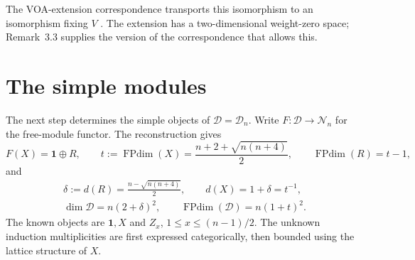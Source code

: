 \documentclass[11pt]{article}
\newcommand{\one}{\mathbf1}\newcommand{\D}{\mathcal D}\newcommand{\Dcat}{\mathcal D}
\newcommand{\Ncat}{\mathcal N}\newcommand{\Pcat}{\mathcal P}\newcommand{\Fcat}{\mathcal F}
\newcommand{\FP}{\operatorname{FPdim}}\newcommand{\Irr}{\operatorname{Irr}}
\numberwithin{equation}{section}
\begin{document}
The VOA-extension correspondence transports this isomorphism to an isomorphism fixing $V$ \cite[Theorem 3.2 and Remark 3.3]{B:HKL}. The extension has a two-dimensional weight-zero space; Remark~3.3 supplies the version of the correspondence that allows this.

\section{The simple modules}\label{sec:spectrum}
The next step determines the simple objects of $\D=\D_n$. Write $F:\D\to\Ncat_n$ for the free-module functor. The reconstruction gives
\begin{equation}\label{B:FX}
 F(X)=\one\oplus R,\qquad
 t:=\FP(X)=\frac{n+2+\sqrt{n(n+4)}}2,\qquad \FP(R)=t-1,
\end{equation}
and
\begin{equation}\label{B:dims}
 \begin{gathered}
 \delta:=d(R)=\frac{n-\sqrt{n(n+4)}}2,\qquad d(X)=1+\delta=t^{-1},\\
 \dim\D=n(2+\delta)^2,\qquad \FP(\D)=n(1+t)^2.
 \end{gathered}
\end{equation}
The known objects are $\one,X$ and $Z_x$, $1\leq x\leq(n-1)/2$. The unknown induction multiplicities are first expressed categorically, then bounded using the lattice structure of $X$.
\end{document}
